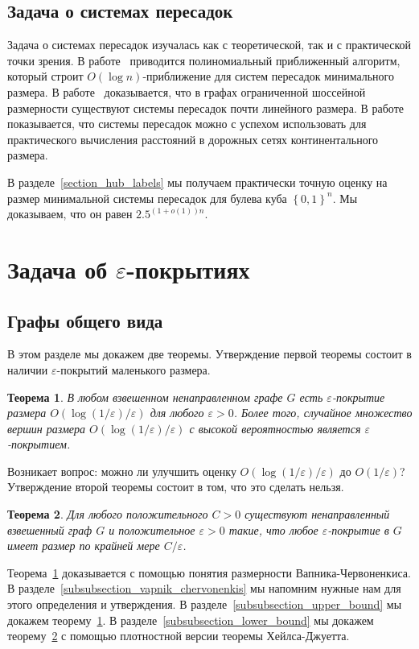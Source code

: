 \documentclass[12pt]{article}
\newcommand{\eps}{\varepsilon}
\newcommand{\set}[1]{\left\{#1\right\}}
\newcommand{\zo}{\set{0, 1}}
\newtheorem{theorem}{Теорема}
\begin{document}
    \subsection{Задача о системах пересадок}

    Задача о системах пересадок изучалась как с теоретической, так и с практической точки зрения.
    В работе~\cite{CHKZ02} приводится полиномиальный приближенный алгоритм, который строит $O(\log n)$-приближение
    для систем пересадок минимального размера.
    В работе~\cite{AFGW10} доказывается, что в графах ограниченной шоссейной размерности существуют системы пересадок
    почти линейного размера.
    В работе~\cite{ADGW11} показывается, что системы пересадок можно с успехом использовать для практического
    вычисления расстояний в дорожных сетях континентального размера.

    В разделе~\ref{section_hub_labels} мы получаем практически точную оценку на размер минимальной системы пересадок
    для булева куба $\zo^n$. Мы доказываем, что он равен $2.5^{(1 + o(1)) n}$.
    \section{Задача об $\eps$-покрытиях}
    \label{section_eps_covers}
    \subsection{Графы общего вида}
    \label{subsection_general_graphs}
    В этом разделе мы докажем две теоремы.
    Утверждение первой теоремы состоит в наличии $\eps$-покрытий маленького размера.
    \begin{theorem}
        \label{upper_bound}
        В любом взвешенном ненаправленном графе $G$ есть $\eps$-покрытие размера $O(\log(1 / \eps) / \eps)$ для
        любого $\eps > 0$. Более того, случайное множество вершин размера $O(\log(1 / \eps) / \eps)$ с высокой вероятностью
        является $\eps$-покрытием.
    \end{theorem}
    Возникает вопрос: можно ли улучшить оценку $O(\log(1 / \eps) / \eps)$ до $O(1 / \eps)$? Утверждение второй теоремы
    состоит в том, что это сделать нельзя.
    \begin{theorem}
        \label{lower_bound}
        Для любого положительного $C > 0$ существуют ненаправленный взвешенный граф $G$ и положительное $\eps > 0$
        такие, что любое $\eps$-покрытие в $G$ имеет размер по крайней мере $C / \eps$.
    \end{theorem}
    Теорема~\ref{upper_bound} доказывается с помощью понятия размерности Вапника-Червоненкиса. В
    разделе~\ref{subsubsection_vapnik_chervonenkis} мы напомним нужные нам для этого определения и утверждения.
    В разделе~\ref{subsubsection_upper_bound} мы докажем теорему~\ref{upper_bound}.
    В разделе~\ref{subsubsection_lower_bound} мы докажем теорему~\ref{lower_bound} с помощью
    плотностной версии теоремы Хейлса-Джуетта.
\end{document}
